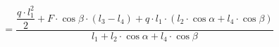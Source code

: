 \documentclass[preview]{standalone}
\begin{document}
\begin{align*}
= \dfrac{\dfrac{q\cdot l_1^2}{2} + F\cdot \cos{\beta} \cdot (l_3 - l_4) + q\cdot l_1\cdot (l_2\cdot \cos{\alpha} + l_4\cdot\cos{\beta})}{l_1 + l_2\cdot \cos{\alpha} + l_4\cdot \cos{\beta}}
\end{align*}
\end{document}
